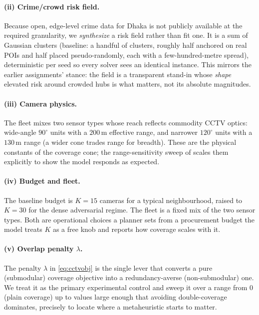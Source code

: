 \documentclass{ai-lab-report}
\begin{document}
\paragraph{(ii) Crime/crowd risk field.} Because open, edge-level crime data for Dhaka is not publicly available at the required granularity, we \emph{synthesize} a risk field rather than fit one. It is a sum of Gaussian clusters (baseline: a handful of clusters, roughly half anchored on real POIs and half placed pseudo-randomly, each with a few-hundred-metre spread), deterministic per seed so every solver sees an identical instance. This mirrors the earlier assignments' stance: the field is a transparent stand-in whose \emph{shape} elevated risk around crowded hubs is what matters, not its absolute magnitudes.

\paragraph{(iii) Camera physics.} The fleet mixes two sensor types whose reach reflects commodity CCTV optics: wide-angle $90^\circ$ units with a $200$\,m effective range, and narrower $120^\circ$ units with a $130$\,m range (a wider cone trades range for breadth). These are the physical constants of the coverage cone; the range-sensitivity sweep of  scales them explicitly to show the model responds as expected.

\paragraph{(iv) Budget and fleet.} The baseline budget is $K{=}15$ cameras for a typical neighbourhood, raised to $K{=}30$ for the dense adversarial regime. The fleet is a fixed mix of the two sensor types. Both are operational choices a planner sets from a procurement budget the model treats $K$ as a free knob and reports how coverage scales with it.

\paragraph{(v) Overlap penalty $\lambda$.} The penalty $\lambda$ in \cref{eq:cctvobj} is the single lever that converts a pure (submodular) coverage objective into a redundancy-averse (non-submodular) one. We treat it as the primary experimental control and sweep it over a range from $0$ (plain coverage) up to values large enough that avoiding double-coverage dominates, precisely to locate where a metaheuristic starts to matter.
\end{document}
